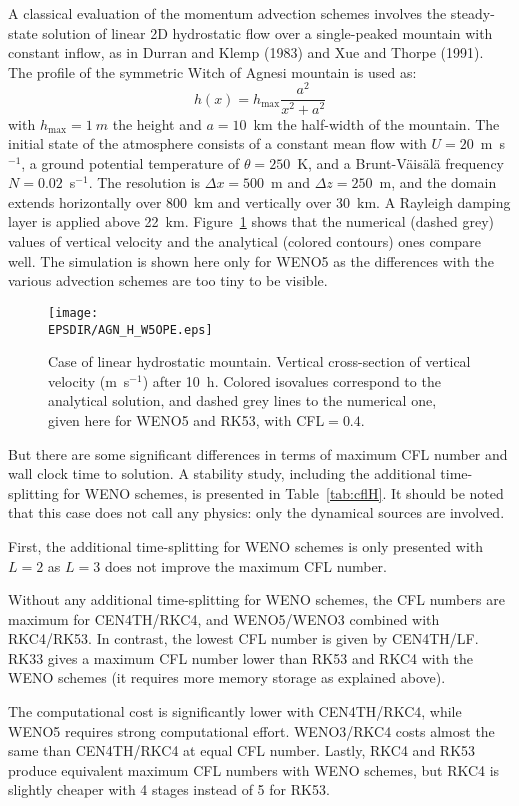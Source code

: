 A classical evaluation of the momentum advection schemes involves the steady-state solution of linear 2D hydrostatic flow over a single-peaked mountain with constant inflow, as in Durran and Klemp (1983) and Xue and Thorpe (1991). The profile of the symmetric Witch of Agnesi mountain is used as: 
$$ h(x) = h_{\max}\frac{a^2}{x^2 + a^2}$$ with $h_{\max}=1~m$ the height and $a=10$~km the half-width of the mountain. The initial state of the atmosphere consists of a constant mean flow with $U=20$~m~s$^{-1}$, a ground potential temperature of $\theta=250$~K, and a Brunt-Väisälä frequency $N=0.02$~s$^{-1}$. The resolution is  $\Delta x = 500$~m and $\Delta z = 250$~m, and the domain extends horizontally over 800~km and vertically over 30~km. A Rayleigh damping layer is applied above 22~km. Figure~\ref{fig:whydro} shows that the numerical (dashed grey) values of vertical velocity and the analytical (colored contours) ones compare well. The simulation is shown here only for WENO5 as the differences with the various advection schemes are too tiny to be visible.

\begin{figure}[ht]
    \centering
    \texttt{[image: \\EPSDIR/AGN\_H\_W5OPE.eps]}
    \caption{Case of linear hydrostatic mountain. Vertical cross-section of vertical velocity (m~s$^{-1}$) after 10~h. Colored isovalues correspond to the analytical solution, and dashed grey lines to the numerical one, given here for WENO5 and RK53, with CFL$=0.4$.}
    \label{fig:whydro}
\end{figure}

But there are some significant differences in terms of maximum CFL number and wall clock time to solution.
A stability study, including the additional time-splitting for WENO schemes, is presented in Table~\ref{tab:cflH}. It should be noted that this case does not call any physics: only the dynamical sources are involved.

First, the additional time-splitting for WENO schemes is only presented with $L=2$ as $L=3$ does not improve the maximum CFL number.

Without any additional time-splitting for WENO schemes, the CFL numbers are maximum for CEN4TH/RKC4, and WENO5/WENO3 combined with RKC4/RK53. In contrast, the lowest CFL number is given by CEN4TH/LF.
RK33 gives a maximum CFL number lower than RK53 and RKC4 with the WENO schemes (it requires more memory storage as explained above). 

\noindent The computational cost is significantly lower with CEN4TH/RKC4, while WENO5 requires strong computational effort. WENO3/RKC4 costs almost the same than CEN4TH/RKC4 at equal CFL number. Lastly, RKC4 and RK53 produce equivalent maximum CFL numbers with WENO schemes, but RKC4 is slightly cheaper with 4 stages instead of 5 for RK53.

